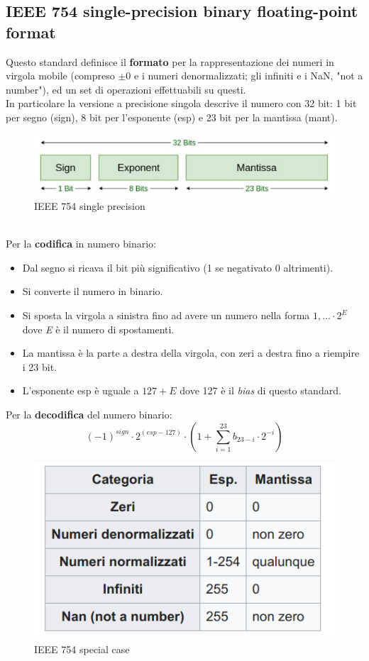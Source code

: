 \documentclass[]{IEEEtran}
\begin{document}
\subsection{IEEE 754 single-precision binary floating-point format}
Questo standard definisce il \textbf{formato} per la rappresentazione dei numeri in virgola mobile (compreso $\pm 0$ e i numeri denormalizzati; gli infiniti e i NaN, "not a number"), ed un set di operazioni effettuabili su questi. 
\\In particolare la versione a precisione singola descrive il numero con 32 bit: 1 bit per segno (sign), 8 bit per l'esponente (esp) e 23 bit per la mantissa (mant)\cite{IEEE754}.
\begin{figure}[!htb]
    \centering
    \includegraphics[width=0.9\linewidth]{figures/ieee754_single_precision.png}
    \caption{IEEE 754 single precision}
    \label{fig:IEEE754}
\end{figure}
\\Per la \textbf{codifica} in numero binario:
\begin{itemize}
    \item Dal segno si ricava il bit più significativo (1 se negativato 0 altrimenti).
    \item Si converte il numero in binario.
    \item Si sposta la virgola a sinistra fino ad avere un numero nella forma $1,... \cdot 2^{E}$ dove \textit{E} è il numero di spostamenti.
    \item La mantissa è la parte a destra della virgola, con zeri a destra fino a riempire i 23 bit.
    \item L'esponente esp è uguale a $127+E$ dove 127 è il \textit{bias} di questo standard.
\end{itemize}
Per la \textbf{decodifica} del numero binario: $$(-1)^{sign}\cdot 2^{(esp-127)} \cdot (1 + \sum_{i=1}^{23}b_{23-i}\cdot 2^{-i})$$
\begin{figure}[!htb]
    \centering
    \includegraphics[width=0.6\linewidth]{figures/ieee754_special_case.png}
    \caption{IEEE 754 special case}
    \label{fig:IEEE_SPECIALCASE}
\end{figure}
\end{document}
